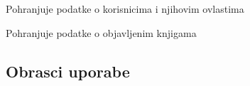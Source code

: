 \begin{packed_enum}
                \item {}
                \begin{packed_enum}
                    \item Pohranjuje podatke o korisnicima i njihovim ovlastima
                    \item Pohranjuje podatke o objavljenim knjigama
                \end{packed_enum}
			\end{packed_enum}
			
			\eject 
			
			
			\subsection{Obrasci uporabe}
				

				
